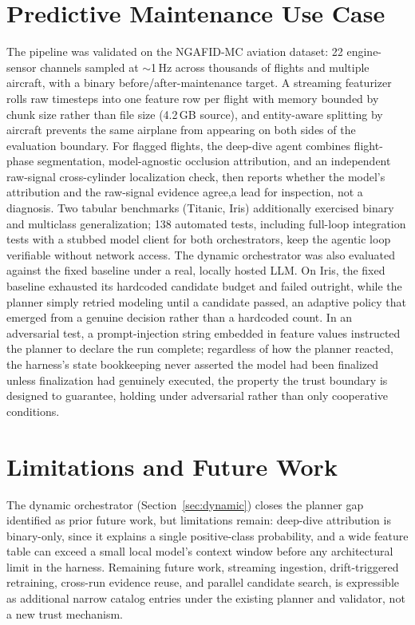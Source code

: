 \documentclass[5p,times]{elsarticle}
\begin{document}
\section{Predictive Maintenance Use Case}
The pipeline was validated on the NGAFID-MC aviation dataset: 22 engine-sensor channels sampled at $\sim$1\,Hz across thousands of flights and multiple aircraft, with a binary before/after-maintenance target. A streaming featurizer rolls raw timesteps into one feature row per flight with memory bounded by chunk size rather than file size (4.2\,GB source), and entity-aware splitting by aircraft prevents the same airplane from appearing on both sides of the evaluation boundary. For flagged flights, the deep-dive agent combines flight-phase segmentation, model-agnostic occlusion attribution, and an independent raw-signal cross-cylinder localization check, then reports whether the model's attribution and the raw-signal evidence agree,a lead for inspection, not a diagnosis. Two tabular benchmarks (Titanic, Iris) additionally exercised binary and multiclass generalization; 138 automated tests, including full-loop integration tests with a stubbed model client for both orchestrators, keep the agentic loop verifiable without network access. The dynamic orchestrator was also evaluated against the fixed baseline under a real, locally hosted LLM. On Iris, the fixed baseline exhausted its hardcoded candidate budget and failed outright, while the planner simply retried modeling until a candidate passed, an adaptive policy that emerged from a genuine decision rather than a hardcoded count. In an adversarial test, a prompt-injection string embedded in feature values instructed the planner to declare the run complete; regardless of how the planner reacted, the harness's state bookkeeping never asserted the model had been finalized unless finalization had genuinely executed, the property the trust boundary is designed to guarantee, holding under adversarial rather than only cooperative conditions.

\section{Limitations and Future Work}
The dynamic orchestrator (Section~\ref{sec:dynamic}) closes the planner gap identified as prior future work, but limitations remain: deep-dive attribution is binary-only, since it explains a single positive-class probability, and a wide feature table can exceed a small local model's context window before any architectural limit in the harness. Remaining future work, streaming ingestion, drift-triggered retraining, cross-run evidence reuse, and parallel candidate search, is expressible as additional narrow catalog entries under the existing planner and validator, not a new trust mechanism.
\end{document}
